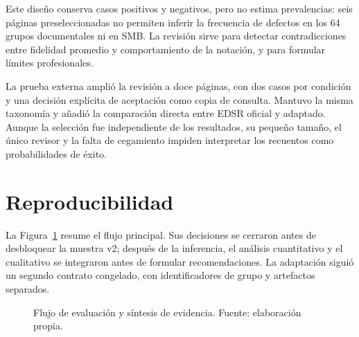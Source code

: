 Este diseño conserva casos positivos y negativos, pero no estima prevalencias: seis páginas
preseleccionadas no permiten inferir la frecuencia de defectos en los 64 grupos documentales ni en SMB. La
revisión sirve para detectar contradicciones entre fidelidad promedio y comportamiento de la
notación, y para formular límites profesionales.

La prueba externa amplió la revisión a doce páginas, con dos casos por condición y una decisión
explícita de aceptación como copia de consulta. Mantuvo la misma taxonomía y añadió la comparación
directa entre EDSR oficial y adaptado. Aunque la selección fue independiente de los resultados, su
pequeño tamaño, el único revisor y la falta de cegamiento impiden interpretar los recuentos como
probabilidades de éxito.

\section{Reproducibilidad}
La Figura~\ref{fig:experimental-workflow} resume el flujo principal. Sus decisiones se cerraron
antes de desbloquear la muestra v2; después de la inferencia, el análisis cuantitativo y el
cualitativo se integraron antes de formular recomendaciones. La adaptación siguió un segundo
contrato congelado, con identificadores de grupo y artefactos separados.

\begin{figure}[htbp]
  \centering
  \caption{Flujo de evaluación y síntesis de evidencia. Fuente: elaboración propia.}
  \label{fig:experimental-workflow}
\end{figure}

